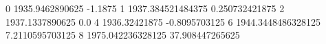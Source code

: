 0 1935.9462890625 -1.1875
1 1937.384521484375 0.250732421875
2 1937.1337890625 0.0
4 1936.32421875 -0.8095703125
6 1944.3448486328125 7.2110595703125
8 1975.042236328125 37.908447265625
